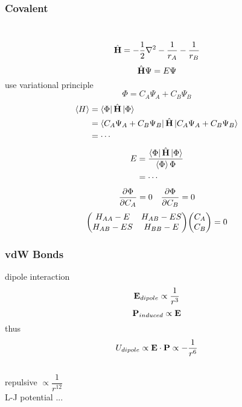 \documentclass[UTF8]{ctexart} %
\numberwithin{equation}{section}
\begin{document}
\subsubsection{Covalent}
\\
\begin{equation}\label{key}
\hat{\vb{H}} = -\dfrac{1}{2}\nabla^2 - \dfrac{1}{r_A} - \dfrac{1}{r_B}
\end{equation}
\begin{equation}\label{key}
\hat{\vb{H}}\Psi = E\Psi
\end{equation}
use variational principle
\begin{equation}\label{key}
\Phi = C_A\Psi_A + C_B\Psi_B
\end{equation}
\begin{equation}\label{key}
\begin{aligned}
\langle H\rangle &= \bra{\Phi}\hat{\vb{H}}\ket{\Phi}\\
&= \bra{C_A\Psi_A + C_B\Psi_B}\hat{\vb{H}}\ket{C_A\Psi_A + C_B\Psi_B}\\
&= \cdots
\end{aligned}
\end{equation}
\begin{equation}\label{key}
\begin{aligned}
E &= \dfrac{\bra{\Phi}\hat{\vb{H}}\ket{\Phi}}{\braket{\Phi}{\Phi}}\\
&= \cdots
\end{aligned}
\end{equation}
\begin{equation}\label{key}
\pdv{\Phi}{C_A} = 0 \quad \pdv{\Phi}{C_B} = 0
\end{equation}
\begin{equation}\label{key}
\mqty(H_{AA}-E & H_{AB}-ES\\
      H_{AB}-ES & H_{BB}-E)
\mqty(C_A\\C_B) = 0
\end{equation}

\subsubsection{vdW Bonds}
dipole interaction
\begin{equation}\label{key}
\vb{E}_{dipole} \propto \dfrac{1}{r^3}
\end{equation}
\begin{equation}\label{key}
\vb{P}_{induced} \propto \vb{E}
\end{equation}
thus
\begin{equation}\label{key}
U_{dipole} \propto \vb{E}\cdot\vb{P} \propto -\dfrac{1}{r^6}
\end{equation}
~\\
repulsive $ \propto \dfrac{1}{r^12} $\\
L-J potential ...\\
\end{document}
